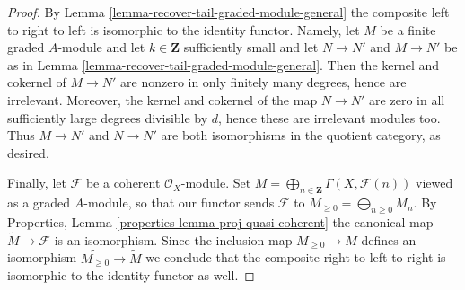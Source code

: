 \begin{proof}
\medskip\noindent
By Lemma \ref{lemma-recover-tail-graded-module-general}
the composite left to right to left is isomorphic to the identity functor.
Namely, let $M$ be a finite graded $A$-module and let
$k \in \mathbf{Z}$ sufficiently small and let
$N \to N'$ and $M \to N'$ be as in
Lemma \ref{lemma-recover-tail-graded-module-general}.
Then the kernel and cokernel of $M \to N'$ are nonzero in
only finitely many degrees, hence are irrelevant. Moreover, the
kernel and cokernel of the map $N \to N'$ are zero in all sufficiently
large degrees divisible by $d$, hence these are irrelevant modules too.
Thus $M \to N'$ and $N \to N'$ are both isomorphisms in the quotient
category, as desired.

\medskip\noindent
Finally, let $\mathcal{F}$ be a coherent $\mathcal{O}_X$-module.
Set $M = \bigoplus_{n \in \mathbf{Z}} \Gamma(X, \mathcal{F}(n))$
viewed as a graded $A$-module, so that our functor sends $\mathcal{F}$ to
$M_{\geq 0} = \bigoplus_{n \geq 0} M_n$.
By Properties, Lemma \ref{properties-lemma-proj-quasi-coherent}
the canonical map $\widetilde M \to \mathcal{F}$
is an isomorphism. Since the inclusion map
$M_{\geq 0} \to M$ defines an isomorphism
$\widetilde{M_{\geq 0}} \to \widetilde M$ we conclude that
the composite right to left to right is isomorphic to the identity
functor as well.
\end{proof}










